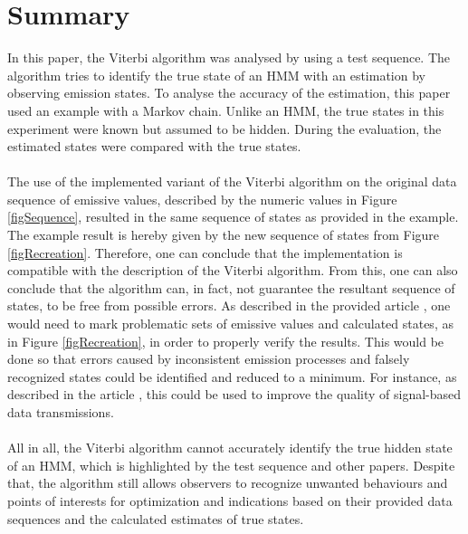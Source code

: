 \documentclass[12pt,journal,compsoc]{IEEEtran}
\begin{document}
\section{Summary}
In this paper, the Viterbi algorithm was analysed by using a test sequence. The algorithm tries to identify the true state of an HMM with an estimation by observing emission states. To analyse the accuracy of the estimation, this paper used an example with a Markov chain. Unlike an HMM, the true states in this experiment were known but assumed to be hidden. During the evaluation, the estimated states were compared with the true states.\\
\\
The use of the implemented variant of the Viterbi algorithm on the original data sequence of emissive values, described by the numeric values in Figure \ref{figSequence}, resulted in the same sequence of states as provided in the example. The example result is hereby given by the new sequence of states from Figure \ref{figRecreation}. Therefore, one can conclude that the implementation is compatible with the description of the Viterbi algorithm. From this, one can also conclude that the algorithm can, in fact, not guarantee the resultant sequence of states, to be free from possible errors. As described in the provided article \cite{article:bissantz}, one would need to mark problematic sets of emissive values and calculated states, as in Figure \ref{figRecreation}, in order to properly verify the results. This would be done so that errors caused by inconsistent emission processes and falsely recognized states could be identified and reduced to a minimum. For instance, as described in the article \cite{article:bissantz}, this could be used to improve the quality of signal-based data transmissions.\\
\\
All in all, the Viterbi algorithm cannot accurately identify the true hidden state of an HMM, which is highlighted by the test sequence and other papers. Despite that, the algorithm still allows observers to recognize unwanted behaviours and points of interests for optimization and indications based on their provided data sequences and the calculated estimates of true states.

\end{document}
